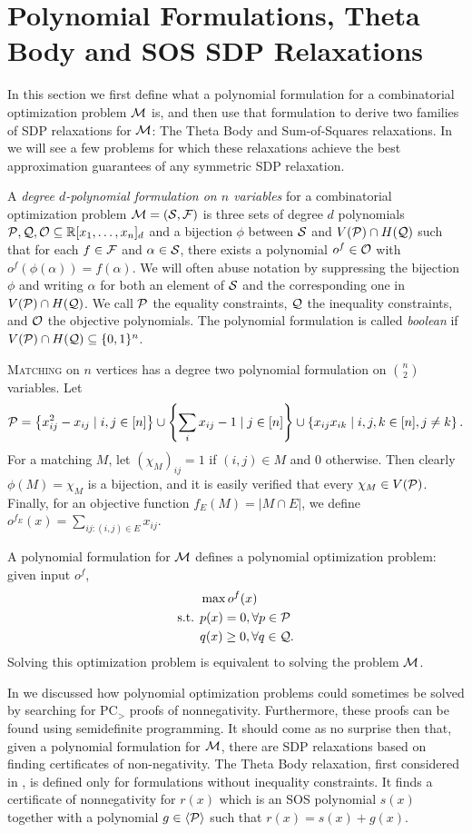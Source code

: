 \section{Polynomial Formulations, Theta Body and SOS SDP Relaxations}\label{sec:polyforms}
In this section we first define what a polynomial formulation for a combinatorial optimization problem $\mathcal M$ is, and then use that formulation to derive two families of SDP relaxations for $\mathcal M$: The Theta Body and Sum-of-Squares relaxations. In  we will see a few problems for which these relaxations achieve the best approximation guarantees of any symmetric SDP relaxation.
\begin{definition}
A \emph{degree $d$-polynomial formulation on $n$ variables} for a combinatorial optimization problem $\mathcal M = (\mathcal S, \mathcal F)$ is three sets of degree $d$ polynomials $\mathcal P,\mathcal Q,\mathcal O \subseteq \mathbb R[x_1,\dots,x_n]_d$ and a bijection $\phi$ between $\mathcal S$ and $V(\mathcal P) \cap H(\mathcal Q)$ such that for each $f \in \mathcal F$ and $\alpha \in \mathcal S$, there exists a polynomial $o^f \in \mathcal O$ with $o^f(\phi(\alpha)) = f(\alpha)$. We will often abuse notation by suppressing the bijection $\phi$ and writing $\alpha$ for both an element of $\mathcal S$ and the corresponding one in $V(\mathcal P) \cap H(\mathcal Q)$. We call $\mathcal P$ the equality constraints, $\mathcal Q$ the inequality constraints, and $\mathcal O$ the objective polynomials. The polynomial formulation is called \emph{boolean} if $V(\mathcal P) \cap H(\mathcal Q) \subseteq \{0,1\}^n$.
\end{definition}
\begin{example}
\textsc{Matching} on $n$ vertices has a degree two polynomial formulation on $\binom{n}{2}$ variables. Let
\[\mathcal P = \left\{x_{ij}^2 - x_{ij} \mid i,j \in [n]\right\} \cup \left\{\sum_i x_{ij} - 1 \mid j \in [n]\right\} \cup \left\{x_{ij}x_{ik} \mid i,j,k \in [n], j\neq k\right\}.\]
For a matching $M$, let $(\chi_M)_{ij} = 1$ if $(i,j) \in M$ and $0$ otherwise. Then clearly $\phi(M) = \chi_M$ is a bijection, and it is easily verified that every $\chi_M \in V(\mathcal P)$. Finally, for an objective function $f_E(M) = |M \cap E|$, we define $o^{f_E}(x) = \sum_{ij: (i,j) \in E} x_{ij}$.
\end{example}
A polynomial formulation for $\mathcal M$ defines a polynomial optimization problem: given input $o^f$,
\begin{align*}
&\max o^f(x) \\
\text{s.t. } &p(x) = 0, \forall p \in \mathcal P \\
&q(x) \geq 0, \forall q \in \mathcal Q.
\end{align*}
Solving this optimization problem is equivalent to solving the problem $\mathcal M$.

In  we discussed how polynomial optimization problems could sometimes be solved by searching for PC$_>$ proofs of nonnegativity. Furthermore, these proofs can be found using semidefinite programming. It should come as no surprise then that, given a polynomial formulation for $\mathcal M$, there are SDP relaxations based on finding certificates of non-negativity. The Theta Body relaxation, first considered in \cite{GPT10}, is defined only for formulations without inequality constraints. It finds a certificate of nonnegativity for $r(x)$ which is an SOS polynomial $s(x)$ together with a polynomial $g \in \langle \mathcal P \rangle$ such that $r(x) = s(x) + g(x)$.

